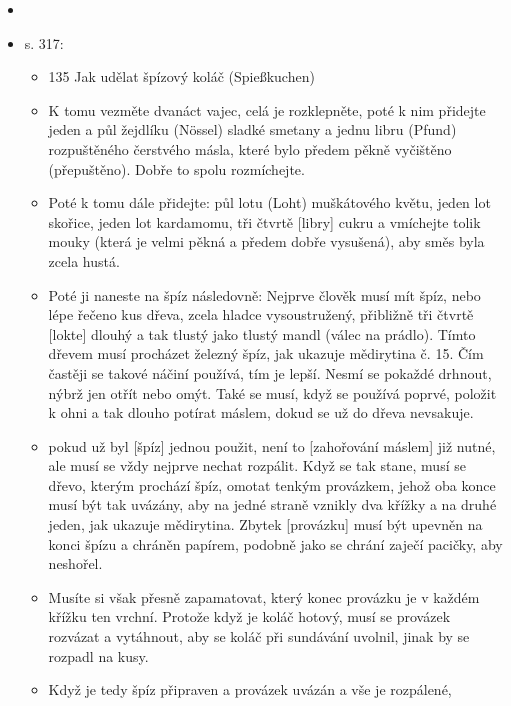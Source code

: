 \begin{itemize}
  \begin{itemize}
  \tightlist
  \item
  \item
    s. 317:

    \begin{itemize}
    \tightlist
    \item
      135 Jak udělat špízový koláč (Spießkuchen)
    \item
      K tomu vezměte dvanáct vajec, celá je rozklepněte, poté k nim
      přidejte jeden a půl žejdlíku (Nössel) sladké smetany a jednu
      libru (Pfund) rozpuštěného čerstvého másla, které bylo předem
      pěkně vyčištěno (přepuštěno). Dobře to spolu rozmíchejte.
    \item
      Poté k tomu dále přidejte: půl lotu (Loht) muškátového květu,
      jeden lot skořice, jeden lot kardamomu, tři čtvrtě {[}libry{]}
      cukru a vmíchejte tolik mouky (která je velmi pěkná a předem dobře
      vysušená), aby směs byla zcela hustá.
    \item
      Poté ji naneste na špíz následovně: Nejprve člověk musí mít špíz,
      nebo lépe řečeno kus dřeva, zcela hladce vysoustružený, přibližně
      tři čtvrtě {[}lokte{]} dlouhý a tak tlustý jako tlustý mandl
      (válec na prádlo). Tímto dřevem musí procházet železný špíz, jak
      ukazuje mědirytina č. 15. Čím častěji se takové náčiní používá,
      tím je lepší. Nesmí se pokaždé drhnout, nýbrž jen otřít nebo omýt.
      Také se musí, když se používá poprvé, položit k ohni a tak dlouho
      potírat máslem, dokud se už do dřeva nevsakuje.
    \item
      pokud už byl {[}špíz{]} jednou použit, není to {[}zahořování
      máslem{]} již nutné, ale musí se vždy nejprve nechat rozpálit.
      Když se tak stane, musí se dřevo, kterým prochází špíz, omotat
      tenkým provázkem, jehož oba konce musí být tak uvázány, aby na
      jedné straně vznikly dva křížky a na druhé jeden, jak ukazuje
      mědirytina. Zbytek {[}provázku{]} musí být upevněn na konci špízu
      a chráněn papírem, podobně jako se chrání zaječí pacičky, aby
      neshořel.
    \item
      Musíte si však přesně zapamatovat, který konec provázku je v
      každém křížku ten vrchní. Protože když je koláč hotový, musí se
      provázek rozvázat a vytáhnout, aby se koláč při sundávání uvolnil,
      jinak by se rozpadl na kusy.
    \item
      Když je tedy špíz připraven a provázek uvázán a vše je rozpálené,

\end{itemize}
\end{itemize}
\end{itemize}
